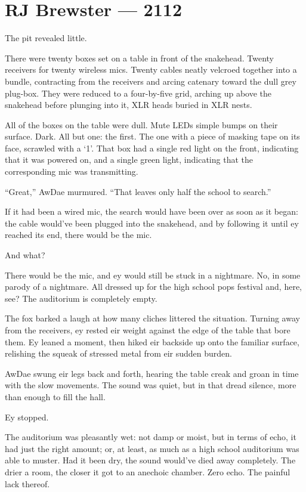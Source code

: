 \hypertarget{rj-brewster-2112}{%
\chapter*{RJ Brewster — 2112}\label{rj-brewster-2112}}

The pit revealed little.

There were twenty boxes set on a table in front of the snakehead. Twenty receivers for twenty wireless mics. Twenty cables neatly velcroed together into a bundle, contracting from the receivers and arcing catenary toward the dull grey plug-box. They were reduced to a four-by-five grid, arching up above the snakehead before plunging into it, XLR heads buried in XLR nests.

All of the boxes on the table were dull. Mute LEDs simple bumps on their surface. Dark. All but one: the first. The one with a piece of masking tape on its face, scrawled with a `1'. That box had a single red light on the front, indicating that it was powered on, and a single green light, indicating that the corresponding mic was transmitting.

``Great,'' AwDae murmured. ``That leaves only half the school to search.''

If it had been a wired mic, the search would have been over as soon as it began: the cable would've been plugged into the snakehead, and by following it until ey reached its end, there would be the mic.

And what?

There would be the mic, and ey would still be stuck in a nightmare. No, in some parody of a nightmare. All dressed up for the high school pops festival and, here, see? The auditorium is completely empty.

The fox barked a laugh at how many cliches littered the situation. Turning away from the receivers, ey rested eir weight against the edge of the table that bore them. Ey leaned a moment, then hiked eir backside up onto the familiar surface, relishing the squeak of stressed metal from eir sudden burden.

AwDae swung eir legs back and forth, hearing the table creak and groan in time with the slow movements. The sound was quiet, but in that dread silence, more than enough to fill the hall.

Ey stopped.

The auditorium was pleasantly wet: not damp or moist, but in terms of echo, it had just the right amount; or, at least, as much as a high school auditorium was able to muster. Had it been dry, the sound would've died away completely. The drier a room, the closer it got to an anechoic chamber. Zero echo. The painful lack thereof.

